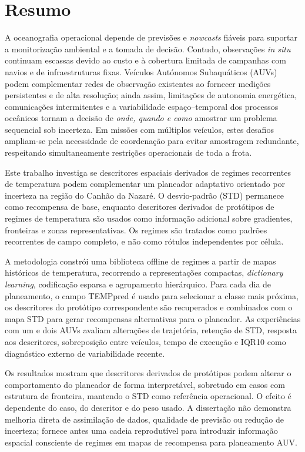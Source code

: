 
\chapter*{Resumo}
%
A oceanografia operacional depende de previsões e \emph{nowcasts} fiáveis para suportar a monitorização ambiental e a tomada de decisão. Contudo, observações \emph{in situ} continuam escassas devido ao custo e à cobertura limitada de campanhas com navios e de infraestruturas fixas. Veículos Autónomos Subaquáticos (AUVs) podem complementar redes de observação existentes ao fornecer medições persistentes e de alta resolução; ainda assim, limitações de autonomia energética, comunicações intermitentes e a variabilidade espaço--temporal dos processos oceânicos tornam a decisão de \emph{onde, quando e como} amostrar um problema sequencial sob incerteza. Em missões com múltiplos veículos, estes desafios ampliam-se pela necessidade de coordenação para evitar amostragem redundante, respeitando simultaneamente restrições operacionais de toda a frota.

Este trabalho investiga se descritores espaciais derivados de regimes recorrentes de temperatura podem complementar um planeador adaptativo orientado por incerteza na região do Canhão da Nazaré. O desvio-padrão (STD) permanece como recompensa de base, enquanto descritores derivados de protótipos de regimes de temperatura são usados como informação adicional sobre gradientes, fronteiras e zonas representativas. Os regimes são tratados como padrões recorrentes de campo completo, e não como rótulos independentes por célula.

A metodologia constrói uma biblioteca offline de regimes a partir de mapas históricos de temperatura, recorrendo a representações compactas, \emph{dictionary learning}, codificação esparsa e agrupamento hierárquico. Para cada dia de planeamento, o campo TEMPpred é usado para selecionar a classe mais próxima, os descritores do protótipo correspondente são recuperados e combinados com o mapa STD para gerar recompensas alternativas para o planeador. As experiências com um e dois AUVs avaliam alterações de trajetória, retenção de STD, resposta aos descritores, sobreposição entre veículos, tempo de execução e IQR10 como diagnóstico externo de variabilidade recente.

Os resultados mostram que descritores derivados de protótipos podem alterar o comportamento do planeador de forma interpretável, sobretudo em casos com estrutura de fronteira, mantendo o STD como referência operacional. O efeito é dependente do caso, do descritor e do peso usado. A dissertação não demonstra melhoria direta de assimilação de dados, qualidade de previsão ou redução de incerteza; fornece antes uma cadeia reprodutível para introduzir informação espacial consciente de regimes em mapas de recompensa para planeamento AUV.

